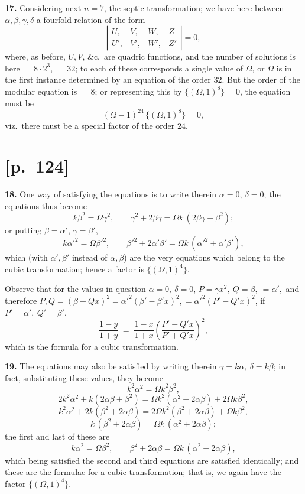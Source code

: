 \documentclass[11pt]{article}
\begin{document}
\medskip
\textbf{17.} Considering next $n=7$, the septic transformation; we have
here between $\alpha,\beta,\gamma,\delta$ a fourfold relation of the form
\[
\left|\begin{array}{cccc} U, & V, & W, & Z \\ U', & V', & W', & Z' \end{array}\right| = 0,
\]
where, as before, $U, V$, \&c.\ are quadric functions, and the number of
solutions is here $= 8\cdot 2^3,\ = 32$; to each of these corresponds a
single value of $\Omega$, or $\Omega$ is in the first instance determined
by an equation of the order $32$. But the order of the modular equation is
$=8$; or representing this by $\{(\Omega, 1)^8\} = 0$, the equation must be
\[
(\Omega - 1)^{24}\,\bigl\{(\Omega, 1)^8\bigr\} = 0,
\]
viz.\ there must be a special factor of the order $24$.

\section*{[p.~124]}

\textbf{18.} One way of satisfying the equations is to write therein
$\alpha=0,\ \delta=0$; the equations thus become
\[
k\beta^2 = \Omega\gamma^2,\qquad
\gamma^2 + 2\beta\gamma = \Omega k\,(2\beta\gamma + \beta^2);
\]
or putting $\beta=\alpha'$, $\gamma=\beta'$,
\[
k\alpha'^2 = \Omega\beta'^2,\qquad
\beta'^2 + 2\alpha'\beta' = \Omega k\,(\alpha'^2 + \alpha'\beta'),
\]
which (with $\alpha',\beta'$ instead of $\alpha,\beta$) are the very
equations which belong to the cubic transformation; hence a factor is
$\{(\Omega, 1)^4\}$.

Observe that for the values in question $\alpha=0,\ \delta=0$,
$P = \gamma x^2,\ Q = \beta,\ =\alpha',$
and therefore $P,Q = (\beta - Q x)^2 = \alpha'^2(\beta' - \beta' x)^2,
=\alpha'^2(P' - Q' x)^2$, if $P' = \alpha',\ Q' = \beta'$,
\[
\frac{1-y}{1+y} \;=\; \frac{1-x}{1+x}\!\left(\frac{P' - Q' x}{P' + Q' x}\right)^{\!2},
\]
which is the formula for a cubic transformation.

\medskip
\textbf{19.} The equations may also be satisfied by writing therein
$\gamma=k\alpha,\ \delta=k\beta$; in fact, substituting these values, they
become
\[
k^2\alpha^2 = \Omega k^2\beta^2,
\]
\[
2k^2\alpha^2 + k(2\alpha\beta+\beta^2) = \Omega k^2(\alpha^2+2\alpha\beta) + 2\Omega k\beta^2,
\]
\[
k^2\alpha^2 + 2k(\beta^2 + 2\alpha\beta) = 2\Omega k^2(\beta^2+2\alpha\beta) + \Omega k\beta^2,
\]
\[
k\,(\beta^2+2\alpha\beta) = \Omega k\,(\alpha^2+2\alpha\beta);
\]
the first and last of these are
\[
k\alpha^2 = \Omega\beta^2,\qquad
\beta^2 + 2\alpha\beta = \Omega k\,(\alpha^2 + 2\alpha\beta),
\]
which being satisfied the second and third equations are satisfied
identically; and these are the formulae for a cubic transformation; that
is, we again have the factor $\{(\Omega, 1)^4\}$.
\end{document}
